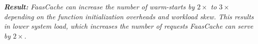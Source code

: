 \noindent \emph{\textbf{Result:} FaasCache can increase the number of warm-starts by $2\times$ to $3\times$ depending on the function initialization overheads and workload skew. This results in lower system load, which increases the number of requests FaasCache can serve by $2\times$.}


